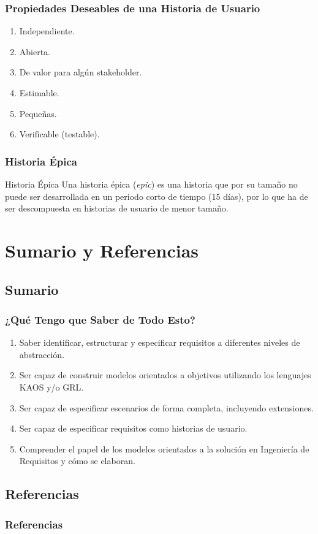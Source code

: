 \documentclass[slidestop,xcolor=pst,dvips,blue]{beamer}
\begin{document}
\begin{frame}[c]
	\frametitle{Propiedades Deseables de una Historia de Usuario}
	\begin{enumerate}[<+->]
		\item Independiente.
        \item Abierta.
        \item De valor para algún stakeholder.
        \item Estimable.
        \item Pequeñas.
        \item Verificable (testable).
	\end{enumerate}
\end{frame}

\begin{frame}[c]
	\frametitle{Historia Épica}
	\begin{block}{Historia Épica}
        Una historia épica (\emph{epic}) es una historia que por su tamaño no puede ser desarrollada en un periodo corto de tiempo (15 días), por lo que ha de ser descompuesta en historias de usuario de menor tamaño.
	\end{block}
\end{frame}

\section{Sumario y Referencias}

\subsection{Sumario}

\begin{frame}[c]
    \frametitle{¿Qué Tengo que Saber de Todo Esto?}
    \begin{enumerate}[<+->]
        \item Saber identificar, estructurar y especificar requisitos a diferentes niveles de abstracción.
        \item Ser capaz de construir modelos orientados a objetivos utilizando los lenguajes KAOS y/o GRL.
        \item Ser capaz de especificar escenarios de forma completa, incluyendo extensiones.
        \item Ser capaz de especificar requisitos como historias de usuario.
        \item Comprender el papel de los modelos orientados a la solución en Ingeniería de Requisitos y cómo se elaboran.
    \end{enumerate}
\end{frame}

\subsection{Referencias}
%
\begin{frame}
	\frametitle{Referencias}
	
	
\end{frame}
\end{document}

